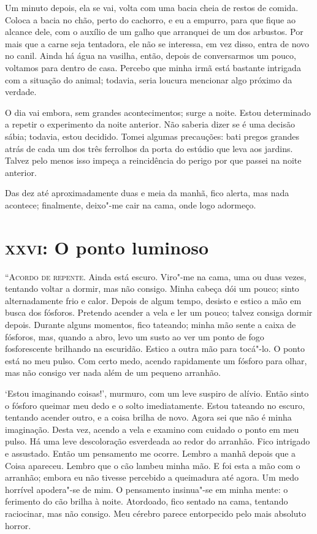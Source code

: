 Um minuto depois, ela se vai, volta com uma bacia cheia de restos de comida. Coloca a bacia no chão, perto do cachorro,
e eu a empurro, para que fique ao alcance dele, com o auxílio de um galho que arranquei de um dos arbustos. Por mais
que a carne seja tentadora, ele não se interessa, em vez disso, entra de novo no canil. Ainda há água na vasilha,
então, depois de conversarmos um pouco, voltamos para dentro de casa. Percebo que minha irmã está bastante intrigada
com a situação do animal; todavia, seria loucura mencionar algo próximo da verdade.

O dia vai embora, sem grandes acontecimentos; surge a noite. Estou determinado a repetir o experimento da noite
anterior. Não saberia dizer se é uma decisão sábia; todavia, estou decidido. Tomei algumas precauções: bati
pregos grandes atrás de cada um dos três ferrolhos da porta do estúdio que leva aos jardins. Talvez pelo menos isso
impeça a reincidência do perigo por que passei na noite anterior.

Das dez até aproximadamente duas e meia da manhã, fico alerta, mas nada acontece; finalmente, deixo"-me cair na cama,
onde logo adormeço.


\clearpage

\chapter{\textsc{xxvi}:  O ponto luminoso}

\textsc{“Acordo de repente.} Ainda está escuro. Viro"-me na cama, uma ou duas vezes, tentando voltar a dormir, mas não consigo.
Minha cabeça dói um pouco; sinto alternadamente frio e calor. Depois de algum tempo, desisto e estico a mão em busca
dos fósforos. Pretendo acender a vela e ler um pouco; talvez consiga dormir depois. Durante alguns momentos, fico
tateando; minha mão sente a caixa de fósforos, mas, quando a abro, levo um susto ao ver um ponto de fogo fosforescente
brilhando na escuridão. Estico a outra mão para tocá"-lo. O ponto está no meu pulso. Com certo medo, acendo rapidamente
um fósforo para olhar, mas não consigo ver nada além de um pequeno arranhão.

‘Estou imaginando coisas!’, murmuro, com um leve suspiro de alívio. Então sinto o fósforo queimar meu dedo e o solto
imediatamente. Estou tateando no escuro, tentando acender outro, e a coisa brilha de novo. Agora sei que não é minha
imaginação. Desta vez, acendo a vela e examino com cuidado o ponto em meu pulso. Há uma leve descoloração esverdeada
ao redor do arranhão. Fico intrigado e assustado. Então um pensamento me ocorre. Lembro a manhã depois que a Coisa
apareceu. Lembro que o cão lambeu minha mão. E foi esta a mão com o arranhão; embora eu não tivesse percebido a
queimadura até agora. Um medo horrível apodera"-se de mim. O pensamento insinua"-se em minha mente: o ferimento do cão
brilha à noite. Atordoado, fico sentado na cama, tentando raciocinar, mas não consigo. Meu cérebro parece entorpecido
pelo mais absoluto horror. 

